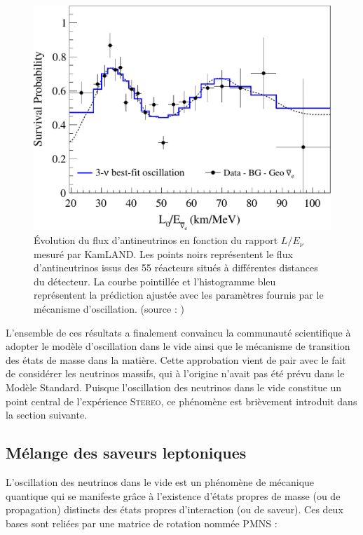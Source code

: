 {\begin{figure}[h!]
\centering
\includegraphics[width=0.8\linewidth]{images/KamLAND_spectrum.pdf}
\caption[Évolution du flux d'antineutrinos en fonction du rapport $L/E_\nu$ mesuré par KamLAND]{Évolution du flux d'antineutrinos en fonction du rapport $L/E_\nu$ mesuré par KamLAND. Les points noirs représentent le flux d'antineutrinos issus des 55 réacteurs situés à différentes distances du détecteur. La courbe pointillée et l'histogramme bleu représentent la prédiction ajustée avec les paramètres fournis par le mécanisme d'oscillation. (source : \cite{Gando:2013nba})}
\label{fig:KamLAND_spectrum.pdf}
\end{figure}

\clearpage

}

L'ensemble de ces résultats a finalement convaincu la communauté scientifique à adopter le modèle d'oscillation dans le vide ainsi que le mécanisme de transition des états de masse dans la matière. Cette approbation vient de pair avec le fait de considérer les neutrinos massifs, qui à l'origine n'avait pas été prévu dans le Modèle Standard. Puisque l'oscillation des neutrinos dans le vide constitue un point central de l'expérience \textsc{Stereo}, ce phénomène est brièvement introduit dans la section suivante.

\bigbreak

\subsection{Mélange des saveurs leptoniques}


L'oscillation des neutrinos dans le vide est un phénomène de mécanique quantique qui se manifeste grâce à l'existence d'états propres de masse (ou de propagation) distincts des états propres d'interaction (ou de saveur). Ces deux bases sont reliées par une matrice de rotation nommée PMNS :

